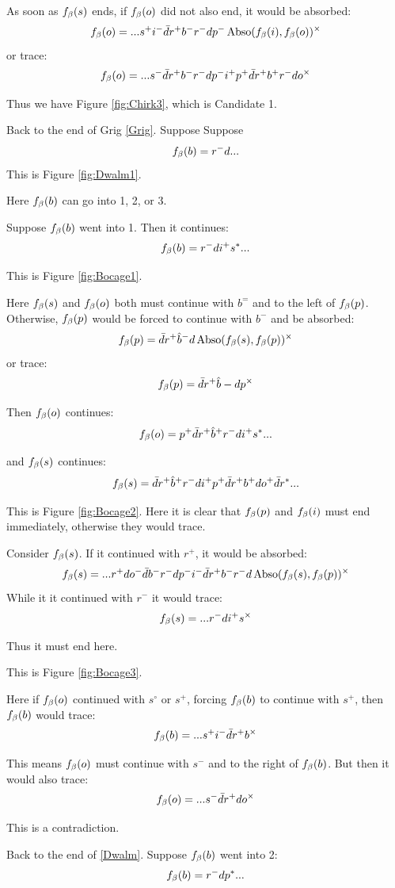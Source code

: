 As soon as $f_\beta(s)$ ends, if $f_\beta(o)$ did not also end, it would be absorbed:
\[
f_\beta(o) =...s^+ i^- \bar{d} r^+ b^- r^- d p^- \operatorname{Abso}(f_\beta(i), f_\beta(o))^\times
\]
or trace:
\[
f_\beta(o) =...s^- \bar{d} r^+ b^- r^- d p^- i^+ p^+ \bar{d} r^+ b^+ r^- d o^\times
\]

Thus we have Figure \ref{fig:Chirk3}, which is Candidate 1.

\label{Dwalm}
Back to the end of Grig \ref{Grig}. Suppose
Suppose
\[
f_\beta(b) = r^- d...
\]
This is Figure \ref{fig:Dwalm1}.

Here $f_\beta(b)$ can go into 1, 2, or 3.

\label{Bocage}
Suppose $f_\beta(b)$ went into 1. Then it continues:
\[
f_\beta(b) = r^- d i^+ s^*...
\]

This is Figure \ref{fig:Bocage1}.

Here $f_\beta(s)$ and $f_\beta(o)$ both must continue with $b^=$ and to the left of $f_\beta(p)$. Otherwise, $f_\beta(p)$ would be forced to continue with $b^-$ and be absorbed:
\[
f_\beta(p) = \bar{d} r^+ \hat{b}^- d \operatorname{Abso}(f_\beta(s), f_\beta(p))^\times
\]
or trace:
\[
f_\beta(p) = \bar{d} r^+ \hat{b}- d p^\times
\]

Then $f_\beta(o)$ continues:
\[
f_\beta(o) = p^+ \bar{d} r^+ \hat{b}^+ r^- d i^+ s^*...
\]

and $f_\beta(s)$ continues:
\[
f_\beta(s) = \bar{d} r^+ \hat{b}^+ r^- d i^+ p^+ \bar{d} r^+ b^+ d o^+ \bar{d} r^*...
\]

This is Figure \ref{fig:Bocage2}. Here it is clear that $f_\beta(p)$ and $f_\beta(i)$ must end immediately, otherwise they would trace.

Consider $f_\beta(s)$. If it continued with $r^+$, it would be absorbed:
\[
f_\beta(s) = ...r^+ d o^- \bar{d} b^- r^- d p^- i^- \bar{d} r^+ b^- r^- d \operatorname{Abso}(f_\beta(s), f_\beta(p))^\times
\]
While it it continued with $r^-$ it would trace:
\[
f_\beta(s) = ...r^- d i^+ s^\times
\]

Thus it must end here.

This is Figure \ref{fig:Bocage3}.

Here if $f_\beta(o)$ continued with $s^\circ$ or $s^+$, forcing $f_\beta(b)$ to continue with $s^+$, then $f_\beta(b)$ would trace:
\[
f_\beta(b) = ...s^+ i^- \bar{d} r^+ b^\times
\]

This means $f_\beta(o)$ must continue with $s^-$ and to the right of $f_\beta(b)$. But then it would also trace:
\[
f_\beta(o) = ...s^- \bar{d} r^+ d o^\times
\]

This is a contradiction.

\label{Cagmag}
Back to the end of \ref{Dwalm}. Suppose $f_\beta(b)$ went into 2:
\[
f_\beta(b) = r^- d p^*...
\]

